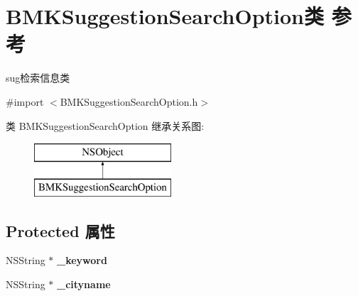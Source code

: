 \hypertarget{interface_b_m_k_suggestion_search_option}{\section{B\+M\+K\+Suggestion\+Search\+Option类 参考}
\label{interface_b_m_k_suggestion_search_option}
}


sug检索信息类  




{\ttfamily \#import $<$B\+M\+K\+Suggestion\+Search\+Option.\+h$>$}

类 B\+M\+K\+Suggestion\+Search\+Option 继承关系图\+:\begin{figure}[H]
\begin{center}
\leavevmode
\includegraphics[height=2.000000cm]{interface_b_m_k_suggestion_search_option}
\end{center}
\end{figure}
\subsection*{Protected 属性}
\begin{DoxyCompactItemize}
\item 
\hypertarget{interface_b_m_k_suggestion_search_option_ae4f74fcd89bf2c869f7b140998b9836f}{N\+S\+String $\ast$ {\bfseries \+\_\+keyword}}\label{interface_b_m_k_suggestion_search_option_ae4f74fcd89bf2c869f7b140998b9836f}

\item 
\hypertarget{interface_b_m_k_suggestion_search_option_a3e69b3fe06083ba59dc4c3c6d5f90e98}{N\+S\+String $\ast$ {\bfseries \+\_\+cityname}}\label{interface_b_m_k_suggestion_search_option_a3e69b3fe06083ba59dc4c3c6d5f90e98}

\end{DoxyCompactItemize}
